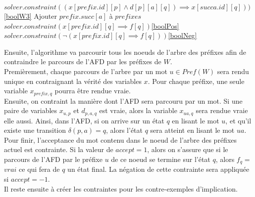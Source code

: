 \documentclass[12pt,a4paper,oneside,titlepage]{report}
\begin{document}
\begin{algorithm}[H]
\begin{algorithmic}[1]
					\State $solver.constraint((x[prefix.id][p]\land d[p][a][q])\implies x[succa.id][q]))$\Comment \ref{boolW3}
				\EndFor
			\EndFor
			\State Ajouter $prefix.succ[a]$ à $prefixes$
		\EndIf
	\EndFor
			\State $solver.constraint(x[prefix.id][q]\implies f[q])$\Comment\ref{boolPos}
		\EndFor
			\State $solver.constraint(\neg(x[prefix.id][q]\implies f[q]))$\Comment \ref{boolNeg}
		\EndFor
	\EndIf
\EndWhile
{}
\end{algorithmic}
\end{algorithm}
\noindent Ensuite, l'algorithme va parcourir tous les noeuds de l'arbre des préfixes afin de contraindre le parcours de l'AFD par les préfixes de $W$.\\
Premièrement, chaque parcours de l'arbre par un mot $u\in Pref(W)$ sera rendu unique en contraignant la vérité des variables $x$. Pour chaque préfixe, une seule variable $x_{prefix, q}$ pourra être rendue vraie.\\
Ensuite, on contraint la manière dont l'AFD sera parcouru par un mot. Si une paire de variables $x_{u,p}$ et $d_{p,a,q}$  est vraie, alors la variable $x_{ua,q}$ sera rendue vraie elle aussi. Ainsi, dans l'AFD, si on arrive sur un état $q$ en lisant le mot $u$, et qu'il existe une transition $\delta(p,a)=q$, alors l'état $q$ sera atteint en lisant le mot $ua$.\\
Pour finir, l'acceptance du mot contenu dans le noeud de l'arbre des préfixes actuel est contrainte. Si la valeur de $accept=1$, alors on s'assure que si le parcours de l'AFD par le préfixe $u$ de ce noeud se termine sur l'état $q$, alors $f_q=$ $vrai$ ce qui fera de $q$ un état final. La négation de cette contrainte sera appliquée si $accept=-1$.\\

\noindent Il reste ensuite à créer les contraintes pour les contre-exemples d'implication.
\end{document}
